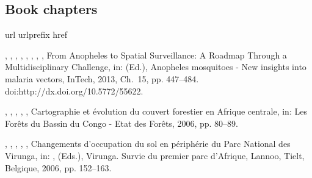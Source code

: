 \documentclass[11pt, a4paper]{article} %
\begin{document}

\nocite{Duveiller2016a,Duveiller2016,Durgun2016,Duveiller2015,Lopez-Lozano2015,Donatelli2015,Duveiller2015a,Low2015,Low2014,Duveiller2013a,Duveiller2013,Sepulcre-Canto2013,Duveiller2012,DeWit2012,Kouadio2012a,Kouadio2012,Curnel2011,Duveiller2011b,Duveiller2011a,Duveiller2010,Duveiller2008}


\begingroup
\renewcommand{\section}[2]{}%


\endgroup


\subsection*{Book chapters}
\begingroup
\renewcommand{\section}[2]{}%
\begin{thebibliography}{1}
\expandafter\ifx\csname url\endcsname\relax
  \def\url#1{\texttt{#1}}\fi
\expandafter\ifx\csname urlprefix\endcsname\relax\def\urlprefix{URL }\fi
\expandafter\ifx\csname href\endcsname\relax
  \def\href#1#2{#2} \def\path#1{#1}\fi

, , ,
  , , ,
  , ,
  \href{http://www.intechopen.com/books/anopheles-mosquitoes-new-insights-into-malaria-vectors/from-anopheles-to-spatial-surveillance-a-roadmap-through-a-multidisciplinary-challenge}{{From
  Anopheles to Spatial Surveillance: A Roadmap Through a Multidisciplinary
  Challenge}}, in:  (Ed.), Anopheles mosquitoes - New
  insights into malaria vectors, InTech, 2013, Ch.~15, pp. 447--484.
\newblock \href {http://www.intechopen.com/books/anopheles-mosquitoes-new-insights-into-malaria-vectors/from-anopheles-to-spatial-surveillance-a-roadmap-through-a-multidisciplinary-challenge}
  {\path{doi:http://dx.doi.org/10.5772/55622}}.

, , ,
  , , {Cartographie et
  {\'{e}}volution du couvert forestier en Afrique centrale}, in: Les
  For{\^{e}}ts du Bassin du Congo - Etat des For{\^{e}}ts, 2006, pp. 80--89.

, ,
  , ,
  , {Changements d'occupation du sol en
  p{\'{e}}riph{\'{e}}rie du Parc National des Virunga}, in:
  ,  (Eds.), Virunga. Survie du
  premier parc d'Afrique, Lannoo, Tielt, Belgique, 2006, pp. 152--163.

\end{thebibliography}
\end{document}
